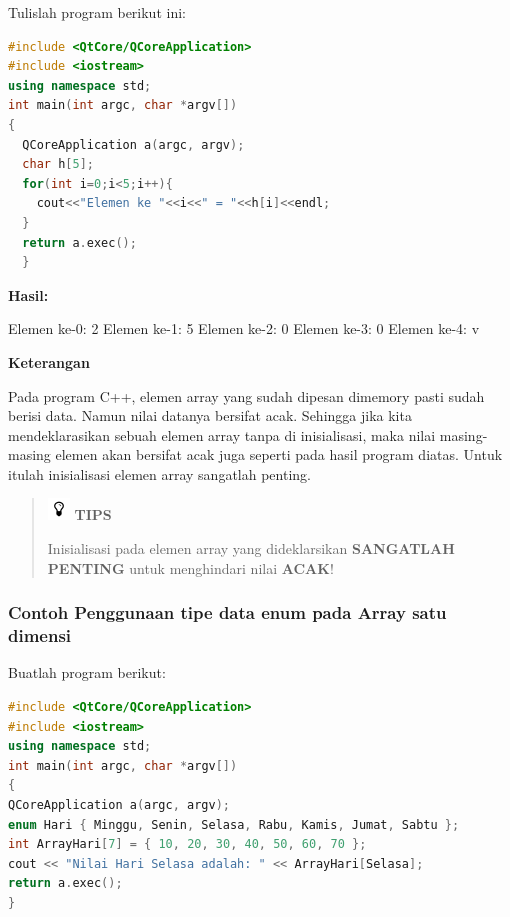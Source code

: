 Tulislah program berikut ini:

\begin{lstlisting}[language=c++, caption=Tanpa inisialisasi array langsung ditampilkan, label=contoh3-6]
#include <QtCore/QCoreApplication>
#include <iostream>
using namespace std;
int main(int argc, char *argv[])
{
  QCoreApplication a(argc, argv);
  char h[5];
  for(int i=0;i<5;i++){
    cout<<"Elemen ke "<<i<<" = "<<h[i]<<endl;
  }
  return a.exec();
  }
\end{lstlisting}

\textbf{Hasil:}

\begin{lcverbatim}
Elemen ke-0: 2
Elemen ke-1: 5
Elemen ke-2: 0
Elemen ke-3: 0
Elemen ke-4: v
\end{lcverbatim}

\textbf{Keterangan}

Pada program C++, elemen array yang sudah dipesan dimemory pasti sudah
berisi data. Namun nilai datanya bersifat acak. Sehingga jika kita
mendeklarasikan sebuah elemen array tanpa di inisialisasi, maka nilai
masing-masing elemen akan bersifat acak juga seperti pada hasil program
diatas. Untuk itulah inisialisasi elemen array sangatlah penting.

\begin{quotation}
\includegraphics{../manuscript/images/tips.png}	 \textbf{TIPS}
	 
	 Inisialisasi pada elemen array yang dideklarsikan \textbf{SANGATLAH
	 	PENTING} untuk menghindari nilai \textbf{ACAK}!
\end{quotation}


\subsubsection*{Contoh  Penggunaan tipe data enum pada Array satu dimensi}

Buatlah program berikut:

\begin{lstlisting}[language=c++, caption=Penggunaan tipe data enum pada Array satu dimensi, label=contoh3-7]
#include <QtCore/QCoreApplication>
#include <iostream>
using namespace std;
int main(int argc, char *argv[])
{
QCoreApplication a(argc, argv);
enum Hari { Minggu, Senin, Selasa, Rabu, Kamis, Jumat, Sabtu };
int ArrayHari[7] = { 10, 20, 30, 40, 50, 60, 70 };
cout << "Nilai Hari Selasa adalah: " << ArrayHari[Selasa];
return a.exec();
}
\end{lstlisting}

